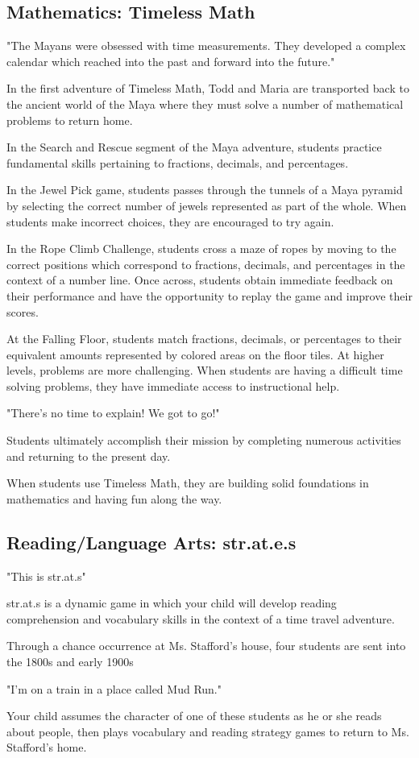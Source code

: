 \subsection{Mathematics: Timeless Math}

"The Mayans were obsessed with time measurements.
They developed a complex calendar which reached into the past and forward into the future."

In the first adventure of Timeless Math, Todd and Maria are transported back to the ancient world of the Maya where they must solve a number of mathematical problems to return home.

In the Search and Rescue segment of the Maya adventure, students practice fundamental skills pertaining to fractions, decimals, and percentages.

In the Jewel Pick game, students passes through the tunnels of a Maya pyramid by selecting the correct number of jewels represented as part of the whole.
When students make incorrect choices, they are encouraged to try again.

In the Rope Climb Challenge, students cross a maze of ropes by moving to the correct positions which correspond to fractions, decimals, and percentages in the context of a number line.
Once across, students obtain immediate feedback on their performance and have the opportunity to replay the game and improve their scores.

At the Falling Floor, students match fractions, decimals, or percentages to their equivalent amounts represented by colored areas on the floor tiles.
At higher levels, problems are more challenging.
When students are having a difficult time solving problems, they have immediate access to instructional help.

"There's no time to explain!
We got to go!"

Students ultimately accomplish their mission by completing numerous activities and returning to the present day.

When students use Timeless Math, they are building solid foundations in mathematics and having fun along the way.

\subsection{Reading/Language Arts: str.at.e.s}

"This is str.at.s"

str.at.s is a dynamic game in which your child will develop reading comprehension and vocabulary skills in the context of a time travel adventure.

Through a chance occurrence at Ms. Stafford's house, four students are sent into the 1800s and early 1900s

"I'm on a train in a place called Mud Run."

Your child assumes the character of one of these students as he or she reads about people, then plays vocabulary and reading strategy games to return to Ms. Stafford's home.